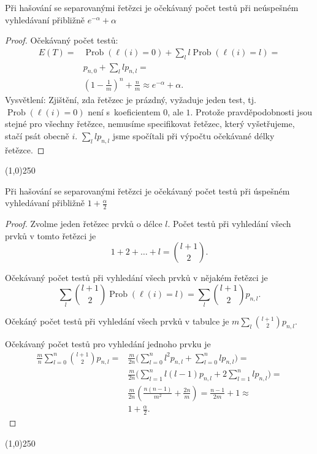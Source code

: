 \documentclass[a4paper,12pt]{article}
\newenvironment{myproof}{
  \begin{proof}
    
  }{
  \end{proof}
  \begin{center}
   \line(1,0){250}
   \end{center}
  }
\DeclareMathOperator*{\Prob}{Prob}
\begin{document}
\begin{veta}
    Při hašování se separovanými řetězci je 
    očekávaný po\-čet testů při neúspeš\-ném 
    vy\-hledávaní přibližně $e^{-\alpha}+\alpha$
\end{veta}

\begin{myproof}
Očekávaný počet testů:
\begin{align*} E(T)=&\Prob(\ell (i)=0)+\sum_ll\Prob(\ell (i)=l)=\\
&p_{n,0}+\sum_llp_{n,l}=\\
&(1-\frac 1m)^n+\frac nm\approx e^{-\alpha}+\alpha .\end{align*}
Vysvětlení: Zjištění, zda řetězec je prázdný, vyžaduje 
jeden test, tj. $\Prob(\ell (i)=0)$ není s~koeficientem $0$, ale $
1$.
Protože pravděpodobnosti jsou stejné pro všechny 
řetězce, nemusíme specifikovat řetězec, který 
vyšetřujeme, stačí psát obecně $i$. $\sum_llp_{
n,l}$ jsme spočítali 
při výpočtu očekávané délky řetězce.
\end{myproof}


\begin{veta}
    Při hašování se separovanými řetězci je 
    očekávaný po\-čet testů při úspeš\-ném 
    vy\-hledávaní přibližně $1+\frac{\alpha}{2}$
\end{veta}

\begin{myproof}
Zvolme jeden řetězec prvků o délce $l$. 
Počet testů při vyhledání všech prvků 
v tomto řetězci je
$$1+2+\dots+l=\binom {l+1}2.$$

Očekávaný počet testů při vyhledání všech 
prvků v nějakém řetězci je 
$$\sum_l\binom {l+1}2\Prob(\ell (i)=l)=\sum_l\binom {l+1}2p_{n,l}
.$$

Očekáný počet testů při vyhledání všech 
prvků v tabulce je $m\sum_l\binom {l+1}2p_{n,l}$.

Očekávaný počet testů pro 
vyhledání jednoho prvku je 
\begin{align*}\frac mn\sum_{l=0}^n\binom {l+1}2p_{n,l}=&\frac m{2n}\big
(\sum_{l=0}^nl^2p_{n,l}+\sum_{l=0}^nlp_{n,l}\big)=\\
&\frac m{2n}\big(\sum_{l=1}^nl(l-1)p_{n,l}+2\sum_{l=1}^nlp_{n,l}\big
)=\\
&\frac m{2n}(\frac {n(n-1)}{m^2}+\frac {2n}m)=\frac {n-1}{2m}+1\approx\\
&1+\frac {\alpha}2.\end{align*}
\end{myproof}
\end{document}
